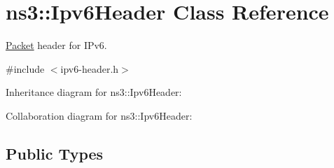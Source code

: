 \hypertarget{classns3_1_1Ipv6Header}{}\section{ns3\+:\+:Ipv6\+Header Class Reference}
\label{classns3_1_1Ipv6Header}


\hyperlink{classns3_1_1Packet}{Packet} header for I\+Pv6.  




{\ttfamily \#include $<$ipv6-\/header.\+h$>$}



Inheritance diagram for ns3\+:\+:Ipv6\+Header\+:


Collaboration diagram for ns3\+:\+:Ipv6\+Header\+:
\subsection*{Public Types}
